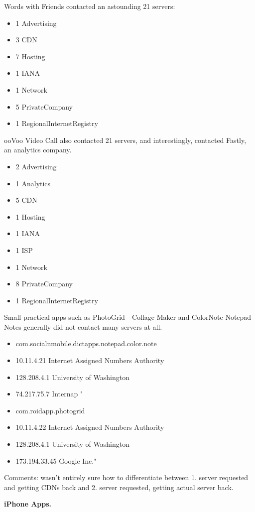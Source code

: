    Words with Friends contacted an astounding 21 servers:
\begin{itemize}
\item    1 Advertising
\item    3 CDN
\item    7 Hosting
\item    1 IANA
\item    1 Network
\item    5 PrivateCompany
\item    1 RegionalInternetRegistry
\end{itemize}
ooVoo Video Call also contacted 21 servers, and interestingly, contacted Fastly, an analytics company. 
\begin{itemize}
\item    2 Advertising
\item    1 Analytics
\item    5 CDN
\item    1 Hosting
  \item  1 IANA
\item    1 ISP
 \item   1 Network
\item    8 PrivateCompany
  \item  1 RegionalInternetRegistry
\end{itemize}

Small practical apps such as PhotoGrid - Collage Maker and ColorNote Notepad Notes generally did not contact many servers at all.
\begin{itemize} 
\item com.socialnmobile.dictapps.notepad.color.note
\item 10.11.4.21	Internet Assigned Numbers Authority
\item 128.208.4.1	University of Washington
\item 74.217.75.7	Internap "
\item com.roidapp.photogrid
\item 10.11.4.22	Internet Assigned Numbers Authority
\item 128.208.4.1	University of Washington
\item 173.194.33.45	Google Inc."
\end{itemize}

Comments: wasn't entirely sure how to differentiate between 1.  server requested and getting CDNs back and 2. server requested, getting actual server back.

  {\bf iPhone Apps.}

